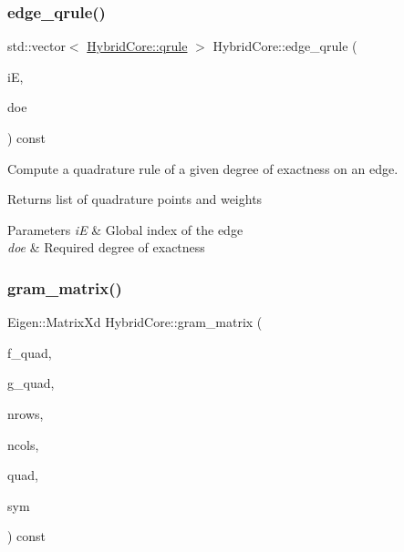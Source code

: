 \subsubsection{\texorpdfstring{edge\+\_\+qrule()}{edge\_qrule()}}
{\footnotesize\ttfamily std\+::vector$<$ \hyperlink{structHCore2D_1_1HybridCore_1_1qrule}{Hybrid\+Core\+::qrule} $>$ Hybrid\+Core\+::edge\+\_\+qrule (\begin{DoxyParamCaption}\item[{const size\+\_\+t}]{iE,  }\item[{const size\+\_\+t}]{doe }\end{DoxyParamCaption}) const}



Compute a quadrature rule of a given degree of exactness on an edge. 

\begin{DoxyReturn}{Returns}
list of quadrature points and weights 
\end{DoxyReturn}

\begin{DoxyParams}{Parameters}
{\em iE} & Global index of the edge \\
\hline
{\em doe} & Required degree of exactness \\
\hline
\end{DoxyParams}
\mbox{\label{classHCore2D_1_1HybridCore_afb723bb5038c74bc2ddb9da3fc3b6c0e}} 
\subsubsection{\texorpdfstring{gram\+\_\+matrix()}{gram\_matrix()}\hspace{0.1cm}{\footnotesize\ttfamily [1/2]}}
{\footnotesize\ttfamily Eigen\+::\+Matrix\+Xd Hybrid\+Core\+::gram\+\_\+matrix (\begin{DoxyParamCaption}\item[{const std\+::vector$<$ Eigen\+::\+Vector\+Xd $>$ \&}]{f\+\_\+quad,  }\item[{const std\+::vector$<$ Eigen\+::\+Vector\+Xd $>$ \&}]{g\+\_\+quad,  }\item[{const size\+\_\+t \&}]{nrows,  }\item[{const size\+\_\+t \&}]{ncols,  }\item[{const std\+::vector$<$ \hyperlink{structHCore2D_1_1HybridCore_1_1qrule}{Hybrid\+Core\+::qrule} $>$ \&}]{quad,  }\item[{const bool \&}]{sym }\end{DoxyParamCaption}) const}

